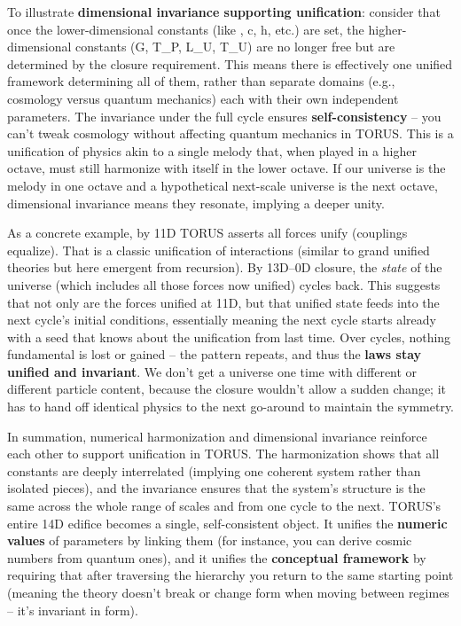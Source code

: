 \documentclass[
]{article}
\begin{document}
To illustrate \textbf{dimensional invariance supporting unification}:
consider that once the lower-dimensional constants (like \alpha, c, h, etc.)
are set, the higher-dimensional constants (G,
T_{P},
L_{U},
T_{U}) are no longer
free but are determined by the closure requirement\hspace{0pt}. This
means there is effectively one unified framework determining all of
them, rather than separate domains (e.g., cosmology versus quantum
mechanics) each with their own independent parameters. The invariance
under the full cycle ensures \textbf{self-consistency} -- you can't
tweak cosmology without affecting quantum mechanics in TORUS. This is a
unification of physics akin to a single melody that, when played in a
higher octave, must still harmonize with itself in the lower octave. If
our universe is the melody in one octave and a hypothetical next-scale
universe is the next octave, dimensional invariance means they resonate,
implying a deeper unity.

As a concrete example, by 11D TORUS asserts all forces unify (couplings
equalize)\hspace{0pt}. That is a classic unification of interactions
(similar to grand unified theories but here emergent from recursion). By
13D--0D closure, the \emph{state} of the universe (which includes all
those forces now unified) cycles back. This suggests that not only are
the forces unified at 11D, but that unified state feeds into the next
cycle's initial conditions, essentially meaning the next cycle starts
already with a seed that knows about the unification from last time.
Over cycles, nothing fundamental is lost or gained -- the pattern
repeats, and thus the \textbf{laws stay unified and invariant}. We don't
get a universe one time with different \alpha or different particle content,
because the closure wouldn't allow a sudden change; it has to hand off
identical physics to the next go-around to maintain the symmetry.

In summation, numerical harmonization and dimensional invariance
reinforce each other to support unification in TORUS. The harmonization
shows that all constants are deeply interrelated (implying one coherent
system rather than isolated pieces), and the invariance ensures that the
system's structure is the same across the whole range of scales and from
one cycle to the next. TORUS's entire 14D edifice becomes a single,
self-consistent object. It unifies the \textbf{numeric values} of
parameters by linking them (for instance, you can derive cosmic numbers
from quantum ones), and it unifies the \textbf{conceptual framework} by
requiring that after traversing the hierarchy you return to the same
starting point (meaning the theory doesn't break or change form when
moving between regimes -- it's invariant in form).
\end{document}
